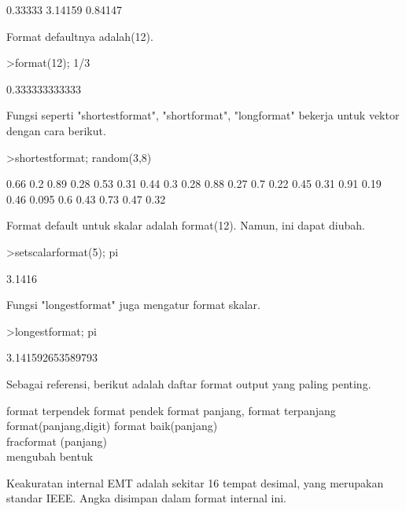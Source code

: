 \documentclass[a4paper,10pt]{article}
\begin{document}
\begin{eulernotebook}
\begin{eulercomment}
\begin{eulercomment}
\begin{euleroutput}
      0.33333 
      3.14159 
      0.84147 
\end{euleroutput}
\begin{eulercomment}
Format defaultnya adalah(12).
\end{eulercomment}
\begin{eulerprompt}
>format(12); 1/3
\end{eulerprompt}
\begin{euleroutput}
  0.333333333333
\end{euleroutput}
\begin{eulercomment}
Fungsi seperti "shortestformat", "shortformat", "longformat" bekerja
untuk vektor dengan cara berikut.
\end{eulercomment}
\begin{eulerprompt}
>shortestformat; random(3,8)
\end{eulerprompt}
\begin{euleroutput}
    0.66    0.2   0.89   0.28   0.53   0.31   0.44    0.3 
    0.28   0.88   0.27    0.7   0.22   0.45   0.31   0.91 
    0.19   0.46  0.095    0.6   0.43   0.73   0.47   0.32 
\end{euleroutput}
\begin{eulercomment}
Format default untuk skalar adalah format(12). Namun, ini dapat
diubah.
\end{eulercomment}
\begin{eulerprompt}
>setscalarformat(5); pi
\end{eulerprompt}
\begin{euleroutput}
  3.1416
\end{euleroutput}
\begin{eulercomment}
Fungsi "longestformat" juga mengatur format skalar.
\end{eulercomment}
\begin{eulerprompt}
>longestformat; pi
\end{eulerprompt}
\begin{euleroutput}
  3.141592653589793
\end{euleroutput}
\begin{eulercomment}
Sebagai referensi, berikut adalah daftar format output yang paling
penting.

format terpendek format pendek format panjang, format terpanjang\\
format(panjang,digit) format baik(panjang)\\
fracformat (panjang)\\
mengubah bentuk


Keakuratan internal EMT adalah sekitar 16 tempat desimal, yang
merupakan standar IEEE. Angka disimpan dalam format internal ini.


\end{eulercomment}
\end{eulercomment}
\end{eulercomment}
\end{eulernotebook}
\end{document}
